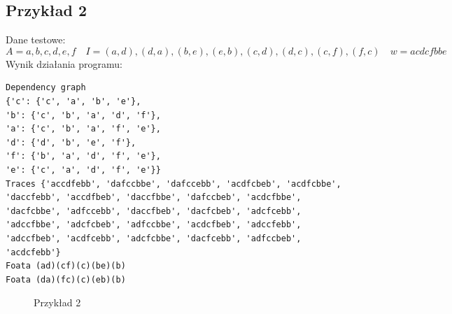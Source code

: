 \documentclass{article}
\begin{document}
    \subsection{Przykład 2}
        Dane testowe:
        $$
        A = {a, b, c, d, e, f}\quad
        I = {(a, d), (d, a), (b, e), (e, b), (c, d), (d, c), (c, f), (f, c)}\quad
        w = acdcfbbe
        $$
        Wynik działania programu:
        \begin{lstlisting}
Dependency graph 
{'c': {'c', 'a', 'b', 'e'}, 
'b': {'c', 'b', 'a', 'd', 'f'}, 
'a': {'c', 'b', 'a', 'f', 'e'}, 
'd': {'d', 'b', 'e', 'f'}, 
'f': {'b', 'a', 'd', 'f', 'e'}, 
'e': {'c', 'a', 'd', 'f', 'e'}}        
Traces {'accdfebb', 'dafccbbe', 'dafccebb', 'acdfcbeb', 'acdfcbbe', 'daccfebb', 'accdfbeb', 'daccfbbe', 'dafccbeb', 'acdcfbbe', 'dacfcbbe', 'adfccebb', 'daccfbeb', 'dacfcbeb', 'adcfcebb', 'adccfbbe', 'adcfcbeb', 'adfccbbe', 'acdcfbeb', 'adccfebb', 'adccfbeb', 'acdfcebb', 'adcfcbbe', 'dacfcebb', 'adfccbeb', 'acdcfebb'}
Foata (ad)(cf)(c)(be)(b)
Foata (da)(fc)(c)(eb)(b)
        \end{lstlisting}
        \begin{figure}[h!]
            \centering
            \caption{Przykład 2}
        \end{figure}

    \newpage
\end{document}
